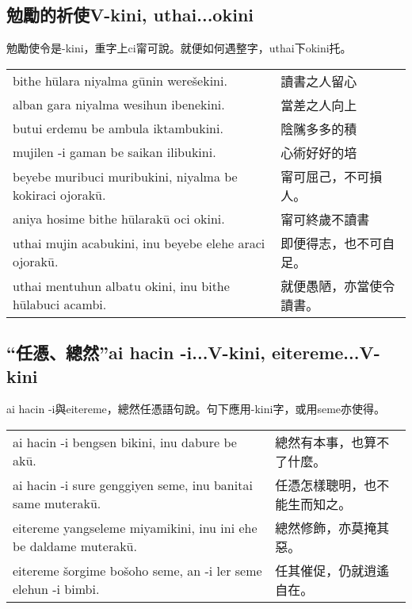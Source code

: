 \documentclass{article}
\begin{document}
\subsection{勉勵的祈使V-kini, uthai...okini}
\noindent 勉勵使令是-kini，重字上ci甯可說。就便如何遇整字，uthai下okini托。
\begin{center}
    \begin{tabularx}{\textwidth}{XX}
        bithe h\={u}lara niyalma g\={u}nin were\v{s}ekini. &讀書之人留心\\
        alban gara niyalma wesihun ibenekini. &當差之人向上\\
        butui erdemu be ambula iktambukini. & 陰隲多多的積\\
        mujilen -i gaman be saikan ilibukini. & 心術好好的培\\
        beyebe muribuci muribukini, niyalma be kokiraci ojorak\={u}. & 甯可屈己，不可損人。\\
        aniya hosime bithe h\={u}larak\={u} oci okini. & 甯可終歲不讀書\\
        uthai mujin acabukini, inu beyebe elehe araci ojorak\={u}. & 即便得志，也不可自足。\\
        uthai mentuhun albatu okini, inu bithe h\={u}labuci acambi. & 就便愚陋，亦當使令讀書。
    \end{tabularx}
\end{center}

\subsection{“任憑、總然”ai hacin -i...V-kini, eitereme...V-kini}
\noindent ai hacin -i與eitereme，總然任憑語句說。句下應用-kini字，或用seme亦使得。
\begin{center}
    \begin{tabularx}{\textwidth}{XX}
        ai hacin -i bengsen bikini, inu dabure be ak\={u}. & 總然有本事，也算不了什麼。\\
        ai hacin -i sure genggiyen seme, inu banitai same muterak\={u}. & 任憑怎樣聰明，也不能生而知之。\\
        eitereme yangseleme miyamikini, inu ini ehe be daldame muterak\={u}. & 總然修飾，亦莫掩其惡。\\
        eitereme \v{s}orgime bo\v{s}oho seme, an -i ler seme elehun -i bimbi. & 任其催促，仍就逍遙自在。
    \end{tabularx}
\end{center}
\end{document}
